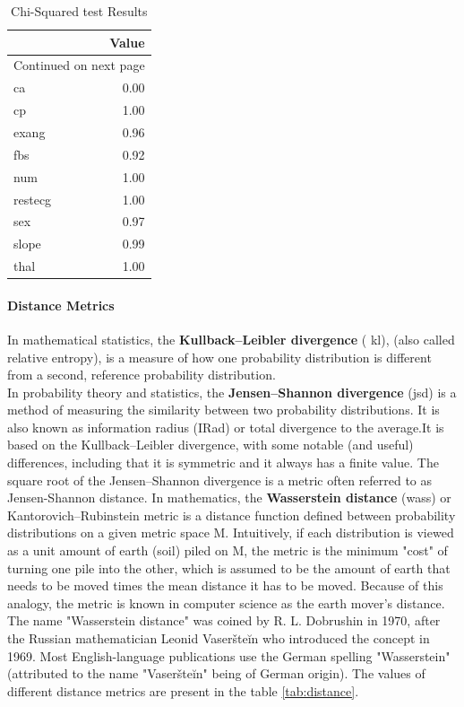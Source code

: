 \documentclass{article}
\begin{document}
\begin{longtable}{lr}
\caption{Chi-Squared test Results}\label{tab:cs}\\
\toprule
{} & Value \\
\midrule
\endhead
\midrule
\multicolumn{2}{r}{{Continued on next page}} \\
\midrule
\endfoot

\bottomrule
\endlastfoot
ca      &  0.00 \\
cp      &  1.00 \\
exang   &  0.96 \\
fbs     &  0.92 \\
num     &  1.00 \\
restecg &  1.00 \\
sex     &  0.97 \\
slope   &  0.99 \\
thal    &  1.00 \\
\end{longtable}



\paragraph{Distance Metrics}
In mathematical statistics, the \textbf{Kullback–Leibler divergence} ( \acrshort{kl}),  (also called relative entropy), is a measure of how one probability distribution is different from a second, reference probability distribution.\\
In probability theory and statistics, the \textbf{Jensen–Shannon divergence} (\acrshort{jsd}) is a method of measuring the similarity between two probability distributions. It is also known as information radius (IRad) or total divergence to the average.It is based on the Kullback–Leibler divergence, with some notable (and useful) differences, including that it is symmetric and it always has a finite value. The square root of the Jensen–Shannon divergence is a metric often referred to as Jensen-Shannon distance.     
In mathematics, the \textbf{Wasserstein distance} (\acrshort{wass}) or Kantorovich–Rubinstein metric is a distance function defined between probability distributions on a given metric space M.
Intuitively, if each distribution is viewed as a unit amount of earth (soil) piled on M, the metric is the minimum "cost" of turning one pile into the other, which is assumed to be the amount of earth that needs to be moved times the mean distance it has to be moved. Because of this analogy, the metric is known in computer science as the earth mover's distance.
The name "Wasserstein distance" was coined by R. L. Dobrushin in 1970, after the Russian mathematician Leonid Vaseršteĭn who introduced the concept in 1969. Most English-language publications use the German spelling "Wasserstein" (attributed to the name "Vaseršteĭn" being of German origin). The values of different distance metrics are present in the table \ref{tab:distance}.\\
\end{document}
